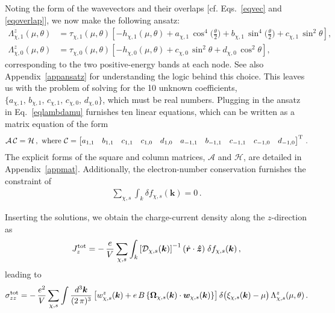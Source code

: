 \documentclass[aps,prb,onecolumn,nofootinbib,citeautoscript,10pt]{revtex4-2}
\def \nn{\nonumber \\}
\begin{document}
Noting the form of the wavevectors and their overlaps [cf. Eqs.~\eqref{eqvec} and \eqref{eqoverlap}],
we now make the following ansatz:
\begin{align}
 {\Lambda}^z_{\chi, 1} (\mu,\theta ) & = 
\tau_{\chi, 1}(\mu,\theta)
 \left [ - h_{\chi, 1} (\mu, \theta) 
 + a_{\chi, 1} \, \cos^4\bigg(\frac{\theta }{2}\bigg)
+ b_{\chi, 1} \,\sin^4\bigg(\frac{\theta }{2}\bigg) 
+ c_{\chi, 1} \, \sin^2 \theta  \right ],\nn
{\Lambda}^z_{\chi, 0} (\mu,\theta ) & = 
 \tau_{\chi, 0} (\mu,\theta)
 \left [ -h_{\chi, 0} (\mu,\theta) 
 + c_{\chi, 0} \,\sin^2 \theta
+ d_{\chi, 0} \, \cos^2 \theta  \right ],
\end{align}
corresponding to the two positive-energy bands at each node. See also Appendix~\ref{appansatz} for understanding the logic behind this choice. This leaves us with the problem of solving for the 10 unknown
coefficients, $\lbrace a_{\chi, 1}  , \, b_{\chi, 1} , \,  c_{\chi, 1} ,
\,c_{\chi, 0}, \,d_{\chi, 0} \rbrace $, which must be real numbers. Plugging in the ansatz in Eq.~\eqref{eqlambdamu} furnishes
ten linear equations, which can be written as a matrix equation of the form
\begin{align}
\label{eqmatrix}
\mathcal A \, \mathcal C = \mathcal H \,, \text{ where }
\mathcal C =\begin{bmatrix}
a_{1, 1} & b_{1, 1}  & c_{1, 1} & c_{1, 0} & d_{1, 0} &
a_{-1, 1} & b_{-1, 1}  & c_{-1, 1} & c_{-1, 0} & d_{-1, 0} 
\end{bmatrix}^{\rm T}\,.
\end{align}
The explicit forms of the square and column matrices, $ \mathcal A $ and $ \mathcal H $, are detailed in Appendix~\ref{appmat}.
Additionally, the electron-number conservation furnishes the constraint of
\begin{align}
\label{eqcon}
\sum \limits_{\chi, s}	\int_k  \delta f_{\chi, s} (\boldsymbol {k}) = 0\,.
\end{align}



Inserting the solutions, we obtain the charge-current density along the $z$-direction as
\begin{align}
\label{def_cur}
	J_z^{\rm tot} =- \,\frac{e}{ V }\sum_{\chi,s}
\int_k	\left[ {\mathcal D}_{\chi, s}  ({\boldsymbol k}) \right ]^{-1}
(\dot{\boldsymbol {r}} \cdot \boldsymbol{\hat z})
\;  \delta f_{\chi, s} (\boldsymbol k)\,,
\end{align}
leading to
\begin{align}
\sigma_{zz}^{\rm tot} =  -\,\frac{e^2 } { V } 
\sum_{\chi,s}
\int \frac{d^3 {\boldsymbol k}} {(2\, \pi)^3} 
	\left[   w^z_{\chi, s} (\boldsymbol k)
+ e \, B  \left \lbrace \boldsymbol \Omega_{\chi, s} (\boldsymbol k)
\cdot 	  \boldsymbol{w}_{\chi, s} (\boldsymbol k) \right  \rbrace   \right] 
\delta \big (\xi_{\chi, s} (\boldsymbol k)-\mu \big) \, {\Lambda}^z_{\chi, s} (\mu, \theta )	\,. 
\end{align} 
\end{document}
